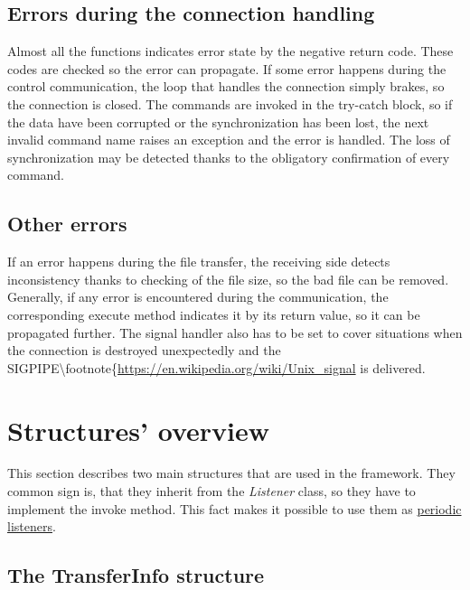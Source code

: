 \subsection*{Errors during the connection handling}

Almost all the functions indicates error state by the negative return
code. These codes are checked so the error can propagate. If some error
happens during the control communication, the loop that handles the
connection simply brakes, so the connection is closed. The commands are
invoked in the try-catch block, so if the data have been corrupted or
the synchronization has been lost, the next invalid command name raises
an exception and the error is handled. The loss of synchronization may
be detected thanks to the obligatory confirmation of every command.

\subsection*{Other errors}

If an error happens during the file transfer, the receiving side detects
inconsistency thanks to checking of the file size, so the bad file can
be removed. Generally, if any error is encountered during the
communication, the corresponding execute method indicates it by its
return value, so it can be propagated further. The signal handler also
has to be set to cover situations when the connection is destroyed
unexpectedly and the
SIGPIPE\textbackslash{}footnote\{\url{https://en.wikipedia.org/wiki/Unix\_signal}
is delivered.

\section{Structures' overview}\label{structures-overview}

This section describes two main structures that are used in the
framework. They common sign is, that they inherit from the
\textit{Listener} class, so they have to implement the invoke method.
This fact makes it possible to use them as
\hyperref[periodic-actions]{periodic listeners}.

\subsection{The TransferInfo
structure}\label{the-transferinfo-structure}

